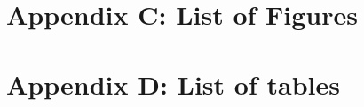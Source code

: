 \documentclass[12pt]{article}
\renewcommand{\_}{\kern-1.5pt\textunderscore\kern-1.5pt}
\begin{document}
\tableofcontents











































\section{Appendix C: List of Figures}
\listoffigures




\newpage

\section{Appendix D: List of tables}
\listoftables



\end{document}
